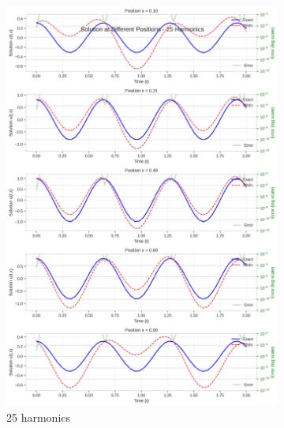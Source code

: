 \begin{figure}[H]
\begin{subfigure}[b]{0.32\textwidth}
        \includegraphics[width=\textwidth]{figures/space_slices_25h.png}
        \caption{25 harmonics}
    \end{subfigure}
    \hfill
    \begin{subfigure}[b]{0.32\textwidth}
        \centering

\end{subfigure}
\end{figure}
